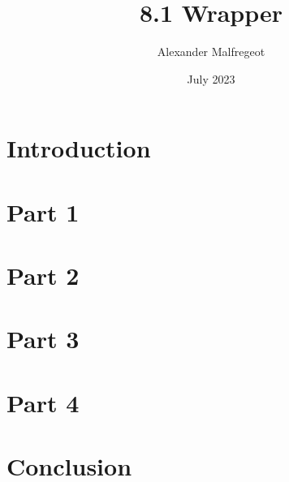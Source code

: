 \documentclass[12pt, letterpaper]{article}
\title{8.1 Wrapper}
\author{Alexander Malfregeot}
\date{July 2023}
\begin{document}
\maketitle
\section{Introduction}
\maketitle
\section{Part 1}
\section{Part 2}
\section{Part 3}
\section{Part 4}
\section{Conclusion}
\end{document}
